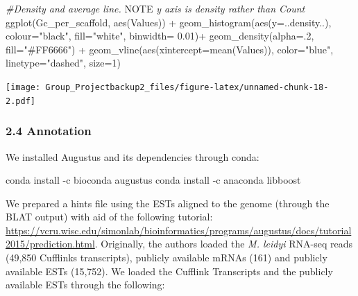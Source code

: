 \documentclass[
]{article}
\newenvironment{Shaded}{\begin{snugshade}}{\end{snugshade}}
\newcommand{\AlertTok}[1]{\textcolor[rgb]{0.94,0.16,0.16}{#1}}
\newcommand{\AttributeTok}[1]{\textcolor[rgb]{0.77,0.63,0.00}{#1}}
\newcommand{\CommentTok}[1]{\textcolor[rgb]{0.56,0.35,0.01}{\textit{#1}}}
\newcommand{\DecValTok}[1]{\textcolor[rgb]{0.00,0.00,0.81}{#1}}
\newcommand{\ExtensionTok}[1]{#1}
\newcommand{\FloatTok}[1]{\textcolor[rgb]{0.00,0.00,0.81}{#1}}
\newcommand{\FunctionTok}[1]{\textcolor[rgb]{0.00,0.00,0.00}{#1}}
\newcommand{\NormalTok}[1]{#1}
\newcommand{\SpecialCharTok}[1]{\textcolor[rgb]{0.00,0.00,0.00}{#1}}
\newcommand{\StringTok}[1]{\textcolor[rgb]{0.31,0.60,0.02}{#1}}
\begin{document}
\begin{Shaded}
\begin{Highlighting}[]
\CommentTok{\#Density and average line. }\AlertTok{NOTE}\CommentTok{ y axis is density rather than Count}
\FunctionTok{ggplot}\NormalTok{(Gc\_per\_scaffold, }\FunctionTok{aes}\NormalTok{(Values)) }\SpecialCharTok{+}
  \FunctionTok{geom\_histogram}\NormalTok{(}\FunctionTok{aes}\NormalTok{(}\AttributeTok{y=}\NormalTok{..density..), }\AttributeTok{colour=}\StringTok{"black"}\NormalTok{, }\AttributeTok{fill=}\StringTok{"white"}\NormalTok{,  }\AttributeTok{binwidth=} \FloatTok{0.01}\NormalTok{)}\SpecialCharTok{+}
  \FunctionTok{geom\_density}\NormalTok{(}\AttributeTok{alpha=}\NormalTok{.}\DecValTok{2}\NormalTok{, }\AttributeTok{fill=}\StringTok{"\#FF6666"}\NormalTok{) }\SpecialCharTok{+}
  \FunctionTok{geom\_vline}\NormalTok{(}\FunctionTok{aes}\NormalTok{(}\AttributeTok{xintercept=}\FunctionTok{mean}\NormalTok{(Values)),}
             \AttributeTok{color=}\StringTok{"blue"}\NormalTok{, }\AttributeTok{linetype=}\StringTok{"dashed"}\NormalTok{, }\AttributeTok{size=}\DecValTok{1}\NormalTok{)}
\end{Highlighting}
\end{Shaded}

\texttt{[image: Group\_Projectbackup2\_files/figure-latex/unnamed-chunk-18-2.pdf]}

\hypertarget{annotation}{%
\subsubsection{2.4 Annotation}\label{annotation}}

We installed Augustus and its dependencies through conda:

\begin{Shaded}
\begin{Highlighting}[]

\ExtensionTok{conda}\NormalTok{ install {-}c bioconda augustus}
\ExtensionTok{conda}\NormalTok{ install {-}c anaconda libboost}
\end{Highlighting}
\end{Shaded}

We prepared a hints file using the ESTs aligned to the genome (through
the BLAT output) with aid of the following tutorial:
\url{https://vcru.wisc.edu/simonlab/bioinformatics/programs/augustus/docs/tutorial2015/prediction.html}.
Originally, the authors loaded the \emph{M. leidyi} RNA-seq reads
(49,850 Cufflinks transcripts), publicly available mRNAs (161) and
publicly available ESTs (15,752). We loaded the Cufflink Transcripts and
the publicly available ESTs through the following:
\end{document}
